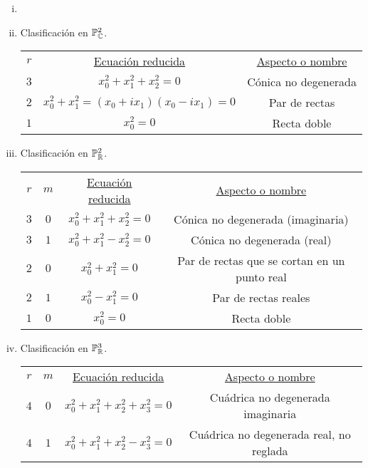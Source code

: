 \begin{example}
  \begin{enumerate}[i)]
    \item[]
    \item Clasificación en $\mathbb{P}^2_{\mathbb{C}}$.
      \begin{center}
        \begin{tabular}{ c c c }
          \underline{$r$} & \underline{Ecuación reducida} & 
          \underline{Aspecto o nombre} \\[1ex] 
           $3$ & $x_0^2 + x_1^2 + x_2^2 = 0$ & Cónica no degenerada \\  
           $2$ & $x_0^2 + x_1^2 = (x_0+ix_1)(x_0-ix_1) = 0$ & Par de rectas \\
           $1$ & $x_0^2 = 0$ & Recta doble
        \end{tabular}
      \end{center}
    \item Clasificación en $\mathbb{P}^2_{\mathbb{R}}$.
      \begin{center}
        \begin{tabular}{ c c c c }
          \underline{$r$} & \underline{$m$} & \underline{Ecuación reducida} & 
          \underline{Aspecto o nombre} \\[1ex] 
           $3$ & $0$ & $x_0^2 + x_1^2 + x_2^2 = 0$ & Cónica no degenerada (imaginaria)\\  
           $3$ & $1$ & $x_0^2 + x_1^2 - x_2^2 = 0$ & Cónica no degenerada (real) \\  
           $2$ & $0$ & $x_0^2 + x_1^2 = 0$ & Par de rectas que se cortan en un punto real\\
           $2$ & $1$ & $x_0^2 - x_1^2 = 0$ & Par de rectas reales\\
           $1$ & $0$ & $x_0^2 = 0$ & Recta doble
        \end{tabular}
      \end{center}
    \item Clasificación en $\mathbb{P}^3_{\mathbb{R}}$.
      \begin{center}
        \begin{tabular}{ c c c c }
          \underline{$r$} & \underline{$m$} & \underline{Ecuación reducida} & 
          \underline{Aspecto o nombre} \\[1ex] 
           $4$ & $0$ & $x_0^2 + x_1^2 + x_2^2 + x_3^2 = 0$ & Cuádrica no degenerada imaginaria\\  
           $4$ & $1$ & $x_0^2 + x_1^2 + x_2^2 - x_3^2 = 0$ & Cuádrica no degenerada real, no reglada \\   

\end{tabular}
\end{center}
\end{enumerate}
\end{example}
